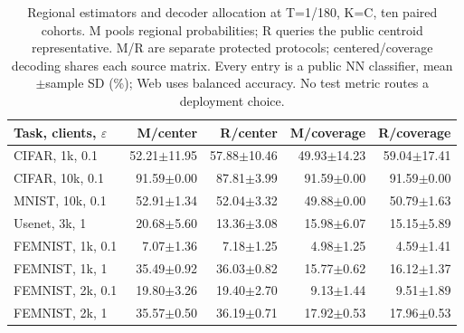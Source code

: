 \begin{table}[t]
\caption{Regional estimators and decoder allocation at T=1/180, K=C, ten paired cohorts. M pools regional probabilities; R queries the public centroid representative. M/R are separate protected protocols; centered/coverage decoding shares each source matrix. Every entry is a public NN classifier, mean$\pm$sample SD (\%); Web uses balanced accuracy. No test metric routes a deployment choice.}
\label{tab:release-variants}\small
\centering
\begin{tabular}{@{}lrrrr@{}}\toprule
Task, clients, $\varepsilon$ & M/center & R/center & M/coverage & R/coverage \\
\midrule
CIFAR, 1k, 0.1 & 52.21$\pm$11.95 & 57.88$\pm$10.46 & 49.93$\pm$14.23 & 59.04$\pm$17.41 \\
CIFAR, 10k, 0.1 & 91.59$\pm$0.00 & 87.81$\pm$3.99 & 91.59$\pm$0.00 & 91.59$\pm$0.00 \\
MNIST, 10k, 0.1 & 52.91$\pm$1.34 & 52.04$\pm$3.32 & 49.88$\pm$0.00 & 50.79$\pm$1.63 \\
Usenet, 3k, 1 & 20.68$\pm$5.60 & 13.36$\pm$3.08 & 15.98$\pm$6.07 & 15.15$\pm$5.89 \\
FEMNIST, 1k, 0.1 & 7.07$\pm$1.36 & 7.18$\pm$1.25 & 4.98$\pm$1.25 & 4.59$\pm$1.41 \\
FEMNIST, 1k, 1 & 35.49$\pm$0.92 & 36.03$\pm$0.82 & 15.77$\pm$0.62 & 16.12$\pm$1.37 \\
FEMNIST, 2k, 0.1 & 19.80$\pm$3.26 & 19.40$\pm$2.70 & 9.13$\pm$1.44 & 9.51$\pm$1.89 \\
FEMNIST, 2k, 1 & 35.57$\pm$0.50 & 36.19$\pm$0.71 & 17.92$\pm$0.53 & 17.96$\pm$0.53 \\
\bottomrule\end{tabular}
\end{table}
